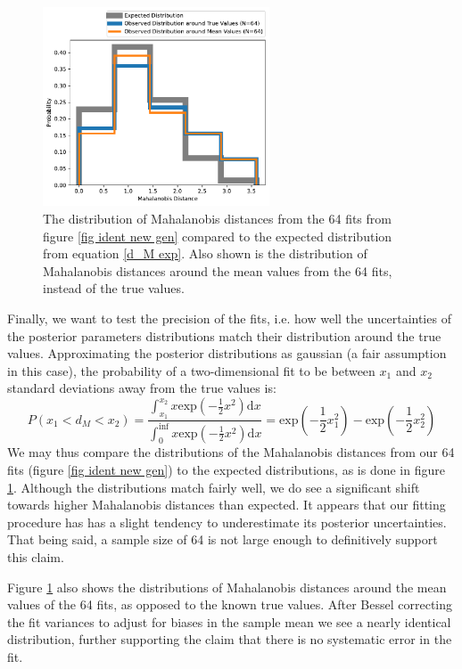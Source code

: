 \documentclass{report}
\begin{document}
\begin{figure}[h]
  \centering
  \includegraphics[width=0.60\textwidth]{Images/Pure_Simulation/d_M_distribution.pdf}
  \caption{The distribution of Mahalanobis distances from the 64 fits from figure \ref{fig ident new gen} compared to the expected distribution from equation \ref{d_M exp}. Also shown is the distribution of Mahalanobis distances around the mean values from the 64 fits, instead of the true values.}
  \label{fig d_M distribution}
\end{figure}


Finally, we want to test the precision of the fits, i.e. how well the uncertainties of the posterior parameters distributions match their distribution around the true values. Approximating the posterior distributions as gaussian (a fair assumption in this case), the probability of a two-dimensional fit to be between $x_1$ and $x_2$ standard deviations away from the true values is:
\begin{equation} \label{d_M exp}
  P(x_1<d_M<x_2) = \frac{\int_{x_1}^{x_2}x \text{exp}(-\frac{1}{2}x^2)\text{d}x}{\int_{0}^{\inf}x \text{exp}(-\frac{1}{2}x^2)\text{d}x} = \text{exp}(-\frac{1}{2}x_1^2) - \text{exp}(-\frac{1}{2}x_2^2)
\end{equation}
We may thus compare the distributions of the Mahalanobis distances from our 64 fits (figure \ref{fig ident new gen}) to the expected distributions, as is done in figure \ref{fig d_M distribution}. Although the distributions match fairly well, we do see a significant shift towards higher Mahalanobis distances than expected. It appears that our fitting procedure has has a slight tendency to underestimate its posterior uncertainties. That being said, a sample size of 64 is not large enough to definitively support this claim.

Figure \ref{fig d_M distribution} also shows the distributions of Mahalanobis distances around the mean values of the 64 fits, as opposed to the known true values. After Bessel correcting the fit variances to adjust for biases in the sample mean we see a nearly identical distribution, further supporting the claim that there is no systematic error in the fit. 
\end{document}
